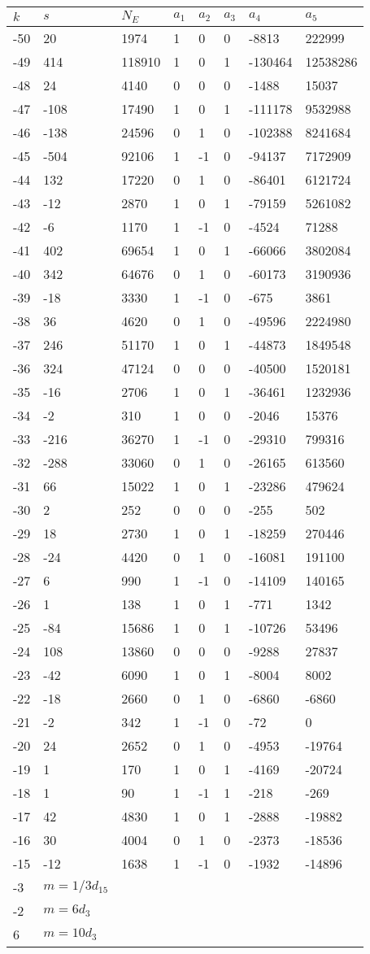 \documentclass{amsart}
\begin{document}
\begin{longtable}{|l|l|l|lllll|}
\hline
$k$ & $s$ & $N_E$ & $a_1$ & $a_2$ & $a_3$ & $a_4$ & $a_5$\\
\hline
-50&20&1974&1&0&0&-8813&222999\\
-49&414&118910&1&0&1&-130464&12538286\\
-48&24&4140&0&0&0&-1488&15037\\
-47&-108&17490&1&0&1&-111178&9532988\\
-46&-138&24596&0&1&0&-102388&8241684\\
-45&-504&92106&1&-1&0&-94137&7172909\\
-44&132&17220&0&1&0&-86401&6121724\\
-43&-12&2870&1&0&1&-79159&5261082\\
-42&-6&1170&1&-1&0&-4524&71288\\
-41&402&69654&1&0&1&-66066&3802084\\
-40&342&64676&0&1&0&-60173&3190936\\
-39&-18&3330&1&-1&0&-675&3861\\
-38&36&4620&0&1&0&-49596&2224980\\
-37&246&51170&1&0&1&-44873&1849548\\
-36&324&47124&0&0&0&-40500&1520181\\
-35&-16&2706&1&0&1&-36461&1232936\\
-34&-2&310&1&0&0&-2046&15376\\
-33&-216&36270&1&-1&0&-29310&799316\\
-32&-288&33060&0&1&0&-26165&613560\\
-31&66&15022&1&0&1&-23286&479624\\
-30&2&252&0&0&0&-255&502\\
-29&18&2730&1&0&1&-18259&270446\\
-28&-24&4420&0&1&0&-16081&191100\\
-27&6&990&1&-1&0&-14109&140165\\
-26&1&138&1&0&1&-771&1342\\
-25&-84&15686&1&0&1&-10726&53496\\
-24&108&13860&0&0&0&-9288&27837\\
-23&-42&6090&1&0&1&-8004&8002\\
-22&-18&2660&0&1&0&-6860&-6860\\
-21&-2&342&1&-1&0&-72&0\\
-20&24&2652&0&1&0&-4953&-19764\\
-19&1&170&1&0&1&-4169&-20724\\
-18&1&90&1&-1&1&-218&-269\\
-17&42&4830&1&0&1&-2888&-19882\\
-16&30&4004&0&1&0&-2373&-18536\\
-15&-12&1638&1&-1&0&-1932&-14896\\
-3&$m=1/3d_{15}$&&\multicolumn{5}{c|}{}\\
-2&$m=6d_{3}$&&\multicolumn{5}{c|}{}\\
6&$m=10d_{3}$&&\multicolumn{5}{c|}{}\\
\hline
\end{longtable}
\end{document}

